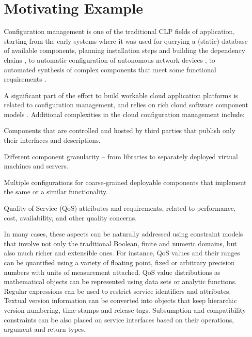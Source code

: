 \documentclass[runningheads,a4paper,11pt,dvipsname]{llncs}
\begin{document}
\section{Motivating Example}
\label{sec:motivating-example}

Configuration management is one of the traditional CLP fields of
application, starting from the early systems where it was used for
querying a (static) database of available components, planning
installation steps and building the dependency chains
\cite{Dart:1991:CCM:111062.111063,amos-cbd}, to automatic
configuration of autonomous network devices \cite{5188808}, to
automated synthesis of complex components that meet some functional
requirements \cite{DBLP:conf/ijcai/PistoreMBT05}.

A significant part of the effort to build workable cloud application
platforms is related to configuration management, and relies on rich
cloud software component models \cite{DBLP:conf/sefm/CosmoZZ12}.
Additional complexities in the cloud configuration management include:

\begin{compactitem}
\item Components that are controlled and hosted by third parties that
  publish only their interfaces and descriptions.
\item Different component granularity -- from libraries to separately
  deployed virtual machines and servers.
\item Multiple configurations for coarse-grained deployable components
  that implement the same or a similar functionality.
\item Quality of Service (QoS) attributes and requirements, related to
  performance, cost, availability, and other quality concerns.
\end{compactitem}

In many cases, these aspects can be naturally addressed using
constraint models that involve not only the traditional Boolean,
finite and numeric domains, but also much richer and extensible ones.
For instance, QoS values and their ranges can be quantified using a
variety of floating point, fixed or arbitrary precision numbers with
units of measurement attached.  QoS value distributions as
mathematical objects can be represented using data sets or analytic
functions.  Regular expressions can be used to restrict service
identifiers and attributes.  Textual version information can be
converted into objects that keep hierarchic version numbering,
time-stamps and release tags.  Subsumption and compatibility
constraints can be also placed on service interfaces based on their
operations, argument and return types.
\end{document}
